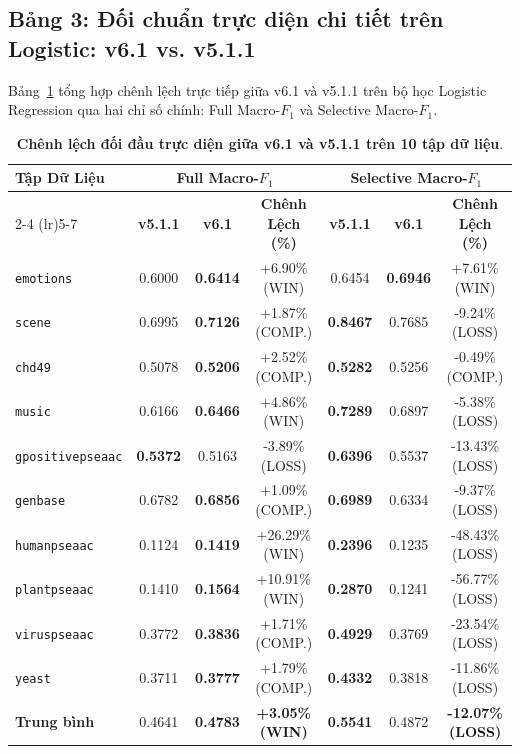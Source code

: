 \documentclass[11pt,a4paper]{article}
\begin{document}
\subsection{Bảng 3: Đối chuẩn trực diện chi tiết trên Logistic: v6.1 vs. v5.1.1}
Bảng~\ref{tab:direct_comparison_v61_v511} tổng hợp chênh lệch trực tiếp giữa v6.1 và v5.1.1 trên bộ học Logistic Regression qua hai chỉ số chính: Full Macro-$F_1$ và Selective Macro-$F_1$.

\begin{table}[H]
\centering
\small
\caption{\textbf{Chênh lệch đối đầu trực diện giữa v6.1 và v5.1.1 trên 10 tập dữ liệu}.}
\label{tab:direct_comparison_v61_v511}
\begin{tabular}{lcccccc}
\toprule
\multirow{2}{*}{\textbf{Tập Dữ Liệu}} & \multicolumn{3}{c}{\textbf{Full Macro-$F_1$}} & \multicolumn{3}{c}{\textbf{Selective Macro-$F_1$}} \\
\cmidrule(lr){2-4} \cmidrule(lr){5-7}
 & \textbf{v5.1.1} & \textbf{v6.1} & \textbf{Chênh Lệch (\%)} & \textbf{v5.1.1} & \textbf{v6.1} & \textbf{Chênh Lệch (\%)} \\
\midrule
\texttt{emotions} & 0.6000 & \textbf{0.6414} & +6.90\% (WIN) & 0.6454 & \textbf{0.6946} & +7.61\% (WIN) \\
\texttt{scene} & 0.6995 & \textbf{0.7126} & +1.87\% (COMP.) & \textbf{0.8467} & 0.7685 & -9.24\% (LOSS) \\
\texttt{chd49} & 0.5078 & \textbf{0.5206} & +2.52\% (COMP.) & \textbf{0.5282} & 0.5256 & -0.49\% (COMP.) \\
\texttt{music} & 0.6166 & \textbf{0.6466} & +4.86\% (WIN) & \textbf{0.7289} & 0.6897 & -5.38\% (LOSS) \\
\texttt{gpositivepseaac} & \textbf{0.5372} & 0.5163 & -3.89\% (LOSS) & \textbf{0.6396} & 0.5537 & -13.43\% (LOSS) \\
\texttt{genbase} & 0.6782 & \textbf{0.6856} & +1.09\% (COMP.) & \textbf{0.6989} & 0.6334 & -9.37\% (LOSS) \\
\texttt{humanpseaac} & 0.1124 & \textbf{0.1419} & +26.29\% (WIN) & \textbf{0.2396} & 0.1235 & -48.43\% (LOSS) \\
\texttt{plantpseaac} & 0.1410 & \textbf{0.1564} & +10.91\% (WIN) & \textbf{0.2870} & 0.1241 & -56.77\% (LOSS) \\
\texttt{viruspseaac} & 0.3772 & \textbf{0.3836} & +1.71\% (COMP.) & \textbf{0.4929} & 0.3769 & -23.54\% (LOSS) \\
\texttt{yeast} & 0.3711 & \textbf{0.3777} & +1.79\% (COMP.) & \textbf{0.4332} & 0.3818 & -11.86\% (LOSS) \\
\midrule
\textbf{Trung bình} & 0.4641 & \textbf{0.4783} & \textbf{+3.05\% (WIN)} & \textbf{0.5541} & 0.4872 & \textbf{-12.07\% (LOSS)} \\
\bottomrule
\end{tabular}
\end{table}
\end{document}
